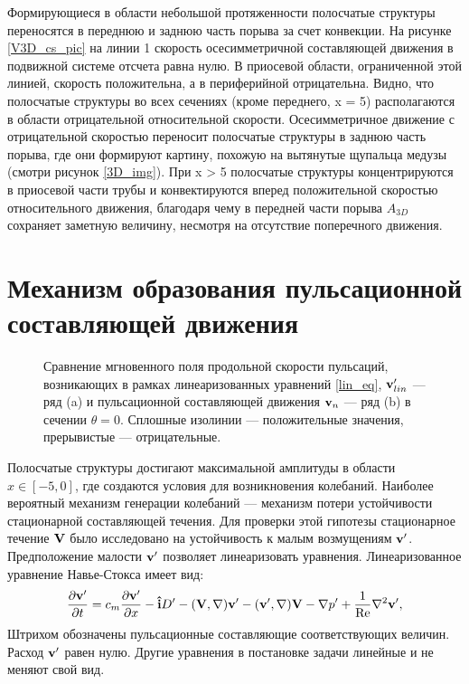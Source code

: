 Формирующиеся в области небольшой протяженности полосчатые структуры переносятся в переднюю и заднюю часть порыва за счет конвекции. На рисунке \ref{V3D_cs_pic} на линии 1 скорость осесимметричной составляющей движения в подвижной системе отсчета равна нулю. В приосевой области, ограниченной этой линией, скорость положительна, а в периферийной отрицательна. Видно, что полосчатые структуры во всех сечениях (кроме переднего, x = 5) располагаются в области отрицательной относительной скорости. Осесимметричное движение с отрицательной скоростью переносит полосчатые структуры в заднюю часть порыва, где они формируют картину, похожую на вытянутые щупальца медузы (смотри рисунок \ref{3D_img}). При x > 5 полосчатые структуры концентрируются в приосевой части трубы и конвектируются вперед положительной скоростью относительного движения, благодаря чему в передней части порыва $A_{3D}$ сохраняет заметную величину, несмотря на отсутствие поперечного движения.


\section{Механизм образования пульсационной составляющей движения}

\begin{figure}
\caption{Сравнение мгновенного поля продольной скорости пульсаций, возникающих в рамках линеаризованных уравнений \eqref{lin_eq}, $\mathbf{v}'_{lin}$ --- ряд (a) и пульсационной составляющей движения $\mathbf{v}_n$ --- ряд (b) в сечении $\theta = 0$. Сплошные изолинии --- положительные значения, прерывистые --- отрицательные.}
\label{lin_ls_cmp_pic}
\end{figure}

Полосчатые структуры достигают максимальной амплитуды в области $x\in[-5,0]$, где создаются условия для возникновения колебаний. Наиболее вероятный механизм генерации колебаний --- механизм потери устойчивости стационарной составляющей течения. Для проверки этой гипотезы стационарное течение $\mathbf{V}$ было исследовано на устойчивость к малым возмущениям $\mathbf{v}'$. Предположение малости $\mathbf{v}'$ позволяет линеаризовать уравнения. Линеаризованное уравнение Навье-Стокса имеет вид: 
\begin{equation} \label{lin_eq}
\frac{\partial \mathbf{v}'}{\partial t} = c_m \frac{\partial \mathbf{v}'}{\partial x} - \mathbf{\hat{i}} D' - (\mathbf{V}, \nabla) \mathbf{v}' - (\mathbf{v}', \nabla) \mathbf{V} - \nabla p' + \frac{1}{\operatorname{Re}} \nabla^2 \mathbf{v}',
\end{equation}
Штрихом обозначены пульсационные составляющие соответствующих величин. Расход $\mathbf{v}'$ равен нулю. Другие уравнения в постановке задачи линейные и не меняют свой вид. 

